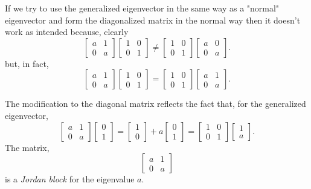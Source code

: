 \documentclass[../MathsNotesBase.tex]{subfiles}
\begin{document}
{		If we try to use the generalized eigenvector in the same way as a "normal" eigenvector and form the diagonalized matrix in the normal way then it doesn't work as intended because, clearly
		\[ 
		\begin{bmatrix}
			a & 1\\
			0 & a
		\end{bmatrix}
		\begin{bmatrix}
			1 & 0\\
			0 & 1
		\end{bmatrix} \neq
		\begin{bmatrix}
			1 & 0\\
			0 & 1
		\end{bmatrix}
		\begin{bmatrix}
			a & 0\\
			0 & a
		\end{bmatrix}.
		\]
		but, in fact,
		\[ 
		\begin{bmatrix}
			a & 1\\
			0 & a
		\end{bmatrix}
		\begin{bmatrix}
			1 & 0\\
			0 & 1
		\end{bmatrix} =
		\begin{bmatrix}
			1 & 0\\
			0 & 1
		\end{bmatrix}
		\begin{bmatrix}
			a & 1\\
			0 & a
		\end{bmatrix}.
		\]
		
		\smallskip
		The modification to the diagonal matrix reflects the fact that, for the generalized eigenvector,
		\[
		\begin{bmatrix}
			a & 1\\
			0 & a
		\end{bmatrix}\begin{bmatrix}0\\ 1\end{bmatrix} = \begin{bmatrix}1\\ 0\end{bmatrix} + a \begin{bmatrix}0\\ 1\end{bmatrix} =
		\begin{bmatrix}
			1 & 0\\
			0 & 1
		\end{bmatrix}\begin{bmatrix}1\\ a\end{bmatrix}.
		\]
		The matrix,
		\[ 
		\begin{bmatrix}
			a & 1\\
			0 & a
		\end{bmatrix}
		\]
		is a \textit{Jordan block} for the eigenvalue $a$.
	}
\end{document}
